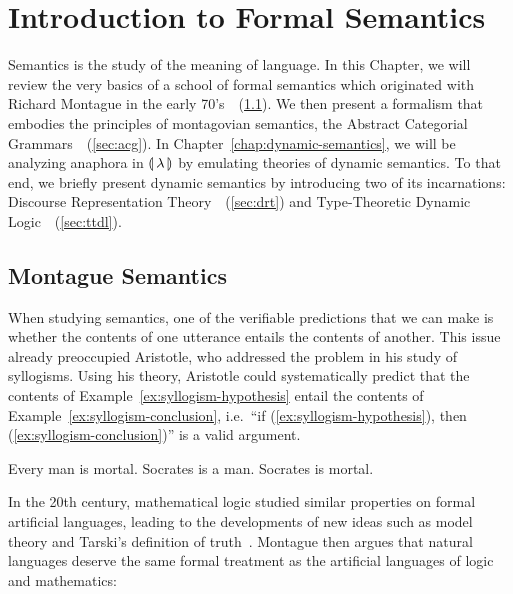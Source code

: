 \chapter{Introduction to Formal Semantics}
\label{chap:intro-fs}

Semantics is the study of the meaning of language. In this Chapter, we will
review the very basics of a school of formal semantics which originated
with Richard Montague in the early
70's~\cite{montague1970english,montague1970universal,montague1973proper}~(\ref{sec:montague}). We
then present a formalism that embodies the principles of montagovian
semantics, the Abstract Categorial
Grammars~\cite{de2001towards}~(\ref{sec:acg}). In
Chapter~\ref{chap:dynamic-semantics}, we will be analyzing anaphora in
${\llparenthesis \, \lambda \, \rrparenthesis}$ by emulating theories of dynamic semantics. To that end, we briefly
present dynamic semantics by introducing two of its incarnations: Discourse
Representation Theory~\cite{kamp1993discourse}~(\ref{sec:drt}) and
Type-Theoretic Dynamic Logic~\cite{de2006towards}~(\ref{sec:ttdl}).

\minitoc


\section{Montague Semantics}
\label{sec:montague}

When studying semantics, one of the verifiable predictions that we can make
is whether the contents of one utterance entails the contents of
another. This issue already preoccupied Aristotle, who addressed the
problem in his study of syllogisms. Using his theory, Aristotle could
systematically predict that the contents of
Example~\ref{ex:syllogism-hypothesis} entail the contents of
Example~\ref{ex:syllogism-conclusion}, i.e.\ ``if
(\ref{ex:syllogism-hypothesis}), then (\ref{ex:syllogism-conclusion})'' is
a valid argument.

\begin{exe}
  \ex Every man is mortal. Socrates is a man. \label{ex:syllogism-hypothesis}
  \ex Socrates is mortal. \label{ex:syllogism-conclusion}
\end{exe}

In the 20th century, mathematical logic studied similar properties on
formal artificial languages, leading to the developments of new ideas such
as model theory and Tarski's definition of
truth~\cite{sep-tarski-truth,tarski1986arithmetical}. Montague then argues
that natural languages deserve the same formal treatment as the artificial
languages of logic and mathematics:

